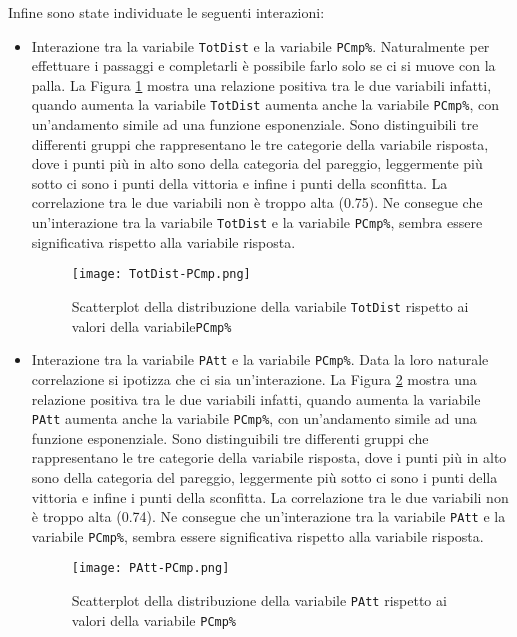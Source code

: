 Infine sono state individuate le seguenti interazioni:
\begin{itemize}
	\item Interazione tra la variabile \texttt{TotDist} e la variabile \texttt{PCmp\%}. Naturalmente per effettuare i passaggi e completarli è possibile farlo solo se ci si muove con la palla. La Figura \ref{fig:totdistpcmp} mostra una relazione positiva tra le due variabili infatti, quando aumenta la variabile \texttt{TotDist} aumenta anche la variabile \texttt{PCmp\%}, con un'andamento simile ad una funzione esponenziale. Sono distinguibili tre differenti gruppi che rappresentano le tre categorie della variabile risposta, dove i punti più in alto sono della categoria del pareggio, leggermente più sotto ci sono i punti della vittoria e infine i punti della sconfitta. La correlazione tra le due variabili non è troppo alta (0.75). Ne consegue che un'interazione tra la variabile \texttt{TotDist} e la variabile \texttt{PCmp\%}, sembra essere significativa rispetto alla variabile risposta.
	
	\begin{figure}[htbp]
		\begin{center}
			\texttt{[image: TotDist-PCmp.png]}
			\caption{Scatterplot della distribuzione della variabile \texttt{TotDist} rispetto ai valori della variabile\texttt{PCmp\%}}  \label{fig:totdistpcmp}
		\end{center}
	\end{figure}
	\item Interazione tra la variabile \texttt{PAtt} e la variabile \texttt{PCmp\%}. Data la loro naturale correlazione si ipotizza che ci sia un'interazione. La Figura \ref{fig:pp} mostra una relazione positiva tra le due variabili infatti, quando aumenta la variabile \texttt{PAtt} aumenta anche la variabile \texttt{PCmp\%}, con un'andamento simile ad una funzione esponenziale. Sono distinguibili tre differenti gruppi che rappresentano le tre categorie della variabile risposta, dove i punti più in alto sono della categoria del pareggio, leggermente più sotto ci sono i punti della vittoria e infine i punti della sconfitta. La correlazione tra le due variabili non è troppo alta (0.74). Ne consegue che un'interazione tra la variabile \texttt{PAtt} e la variabile \texttt{PCmp\%}, sembra essere significativa rispetto alla variabile risposta.
	
	\begin{figure}[htbp]
		\begin{center}
			\texttt{[image: PAtt-PCmp.png]}
			\caption{Scatterplot della distribuzione della variabile \texttt{PAtt} rispetto ai valori della variabile \texttt{PCmp\%}}  \label{fig:pp}
		\end{center}
	\end{figure}


\end{itemize}
